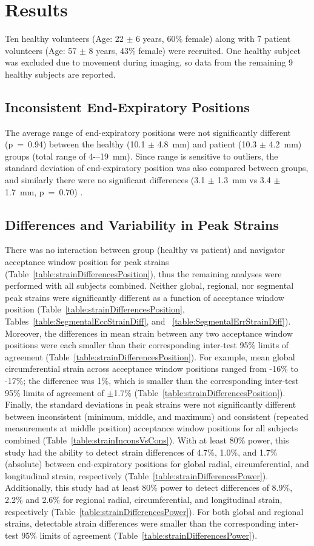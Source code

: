 \section{Results}
	Ten healthy volunteers (Age: 22 $\pm$ 6 years, 60\% female) along with 7 patient volunteers (Age: 57 $\pm$ 8 years, 43\% female) were recruited. One healthy subject was excluded due to movement during imaging, so data from the remaining 9 healthy subjects are reported.
	
\subsection{Inconsistent End-Expiratory Positions}
	The average range of end-expiratory positions were not significantly different (p~=~0.94) between the healthy (10.1 $\pm$ 4.8~mm) and patient (10.3 $\pm$ 4.2~mm) groups (total range of 4-–19~mm). Since range is sensitive to outliers, the standard deviation of end-expiratory position was also compared between groups, and similarly there were no significant differences (3.1 $\pm$ 1.3~mm vs 3.4 $\pm$ 1.7~mm, p~=~0.70) \cite{Hamlet2017}.
	
\subsection{Differences and Variability in Peak Strains}
	There was no interaction between group (healthy vs patient) and navigator acceptance window position for peak strains (Table~\ref{table:strainDifferencesPosition}), thus the remaining analyses were performed with all subjects combined. Neither global, regional, nor segmental peak strains were significantly different as a function of acceptance window position (Table~\ref{table:strainDifferencesPosition}, Tables~\ref{table:SegmentalEccStrainDiff}, and ~\ref{table:SegmentalErrStrainDiff}). Moreover, the differences in mean strain between any two acceptance window positions were each smaller than their corresponding inter-test 95\% limits of agreement (Table~\ref{table:strainDifferencesPosition}). For example, mean global circumferential strain across acceptance window positions ranged from -16\% to -17\%; the difference was 1\%, which is smaller than the corresponding inter-test 95\% limits of agreement of $\pm$1.7\% (Table~\ref{table:strainDifferencesPosition}). Finally, the standard deviations in peak strains were not significantly different between inconsistent (minimum, middle, and maximum) and consistent (repeated measurements at middle position) acceptance window positions for all subjects combined (Table~\ref{table:strainInconsVsCons}). With at least 80\% power, this study had the ability to detect strain differences of 4.7\%, 1.0\%, and 1.7\% (absolute) between end-expiratory positions for global radial, circumferential, and longitudinal strain, respectively (Table~\ref{table:strainDifferencesPower}). Additionally, this study had at least 80\% power to detect differences of 8.9\%, 2.2\% and 2.6\% for regional radial, circumferential, and longitudinal strain, respectively (Table~\ref{table:strainDifferencesPower}). For both global and regional strains, detectable strain differences were smaller than the corresponding inter-test 95\% limits of agreement (Table~\ref{table:strainDifferencesPower}).
	
